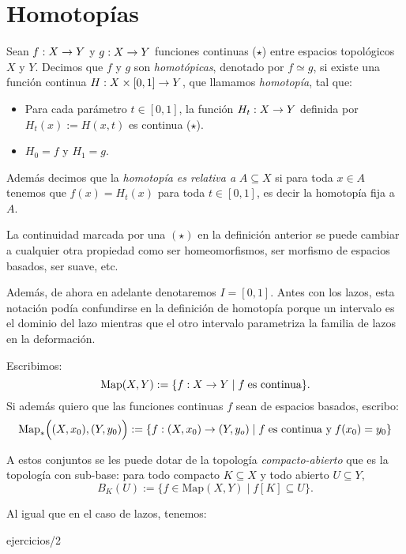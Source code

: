 \documentclass[../../topologia_algebraica.tex]{subfiles}
\begin{document}
\section{Homotop\'ias}
\begin{defin}
  Sean $f:X\rightarrow Y$ y $g:X\rightarrow Y$ funciones continuas ($\star$) entre espacios topol\'ogicos $X$ y $Y$.
  Decimos que $f$ y $g$ son \emph{homot\'opicas}, denotado por $f\simeq g$, si existe una funci\'on
  continua $H:X\times[0,1]\rightarrow Y$, que llamamos \emph{homotop\'ia}, tal que:
  \begin{itemize}
  \item Para cada par\'ametro $t\in[0,1]$, la funci\'on $H_t:X\rightarrow Y$ definida por $H_t(x):=H(x,t)$
    es continua ($\star$).
  \item $H_0=f$ y $H_1=g$.
  \end{itemize}
  Adem\'as decimos que la \emph{homotop\'ia es relativa a} $A\subseteq X$ si para toda $x\in A$ tenemos
  que $f(x)=H_t(x)$ para toda $t\in[0,1]$, es decir la homotop\'ia fija a $A$.
\end{defin}

\begin{nota}
  La continuidad marcada por una $(\star)$ en la definici\'on anterior se puede cambiar a cualquier
  otra propiedad como ser homeomorfismos, ser morfismo de espacios basados, ser suave, etc.

  Adem\'as, de ahora en adelante denotaremos $I=[0,1]$. Antes con los lazos, esta notaci\'on pod\'ia
  confundirse en la definici\'on de homotop\'ia porque un intervalo es el dominio del lazo mientras
  que el otro intervalo parametriza la familia de lazos en la deformaci\'on.
\end{nota}

Escribimos:
\[
  \text{Map}(X,Y):=\{f:X\rightarrow Y\mid f\;\text{es continua}\}.
\]
Si adem\'as quiero que las funciones continuas $f$ sean de espacios basados, escribo:
\[
  \text{Map}_*\Big((X,x_0),(Y,y_0)\Big):=
  \{f:(X,x_0)\rightarrow (Y,y_o) \mid f\;\text{es continua y}\; f(x_0)=y_0\}
\]

A estos conjuntos se les puede dotar de la topolog\'ia \emph{compacto-abierto} que es la topolog\'ia
con sub-base: para todo compacto $K\subseteq X$ y todo abierto $U\subseteq Y$,
\[
  B_K(U):=\{f\in\text{Map}(X,Y) \mid f[K]\subseteq U\}.
\]


Al igual que en el caso de lazos, tenemos:

{ejercicios/2} %
\end{document}
